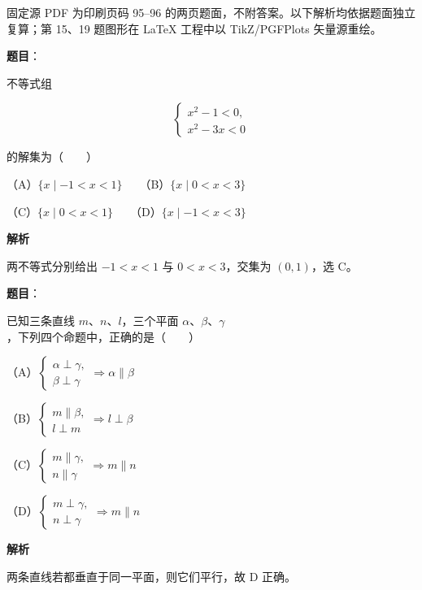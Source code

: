 

\begin{gktip}
固定源 PDF 为印刷页码 95–96 的两页题面，不附答案。以下解析均依据题面独立复算；第 15、19 题图形在 LaTeX 工程中以 TikZ/PGFPlots 矢量源重绘。
\end{gktip}


\begin{answer}

\textbf{题目}：

不等式组

\nopagebreak[4]
\[
\begin{cases}
x^2-1<0,\\
x^2-3x<0
\end{cases}
\]

的解集为\mbox{（　　）}

（A）$\{x\mid -1<x<1\}$　　（B）$\{x\mid 0<x<3\}$

（C）$\{x\mid 0<x<1\}$　　（D）$\{x\mid -1<x<3\}$

\textbf{解析}

两不等式分别给出 $-1<x<1$ 与 $0<x<3$，交集为 $(0,1)$，选 C。


\end{answer}
\begin{answer}

\textbf{题目}：

已知三条直线 $m\text{、}n\text{、}l$，三个平面 $\alpha\text{、}\beta\text{、}\gamma$，下列四个命题中，正确的是\mbox{（　　）}

（A）$\begin{cases}\alpha\perp\gamma,\\ \beta\perp\gamma\end{cases}\Rightarrow\alpha\parallel\beta$

（B）$\begin{cases}m\parallel\beta,\\ l\perp m\end{cases}\Rightarrow l\perp\beta$

（C）$\begin{cases}m\parallel\gamma,\\ n\parallel\gamma\end{cases}\Rightarrow m\parallel n$

（D）$\begin{cases}m\perp\gamma,\\ n\perp\gamma\end{cases}\Rightarrow m\parallel n$

\textbf{解析}

两条直线若都垂直于同一平面，则它们平行，故 D 正确。


\end{answer}

